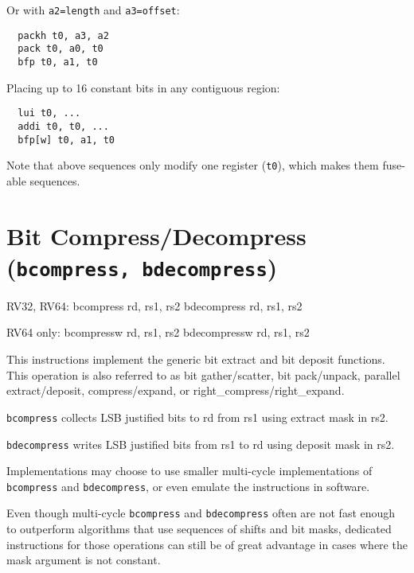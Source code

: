 Or with {\tt a2=length} and {\tt a3=offset}:

\begin{minipage}{\linewidth}
\begin{verbatim}
  packh t0, a3, a2
  pack t0, a0, t0
  bfp t0, a1, t0
\end{verbatim}
\end{minipage}

Placing up to 16 constant bits in any contiguous region:

\begin{minipage}{\linewidth}
\begin{verbatim}
  lui t0, ...
  addi t0, t0, ...
  bfp[w] t0, a1, t0
\end{verbatim}
\end{minipage}

Note that above sequences only modify one register ({\tt t0}), which makes them
fuse-able sequences.


\section{Bit Compress/Decompress (\texttt{bcompress,\ bdecompress})}

\begin{rvb}
  RV32, RV64:
    bcompress rd, rs1, rs2
    bdecompress rd, rs1, rs2

  RV64 only:
    bcompressw rd, rs1, rs2
    bdecompressw rd, rs1, rs2
\end{rvb}

This instructions implement the generic bit extract and bit deposit functions.
This operation is also referred to as bit gather/scatter, bit pack/unpack,
parallel extract/deposit, compress/expand, or right\_compress/right\_expand.

\texttt{bcompress} collects LSB justified bits to rd from rs1 using extract mask in rs2.

\texttt{bdecompress} writes LSB justified bits from rs1 to rd using deposit mask in rs2.



Implementations may choose to use smaller multi-cycle implementations of
\texttt{bcompress} and \texttt{bdecompress}, or even emulate the instructions in software.

Even though multi-cycle \texttt{bcompress} and \texttt{bdecompress} often are not fast
enough to outperform algorithms that use sequences of shifts and bit masks,
dedicated instructions for those operations can still be of great advantage in
cases where the mask argument is not constant.

